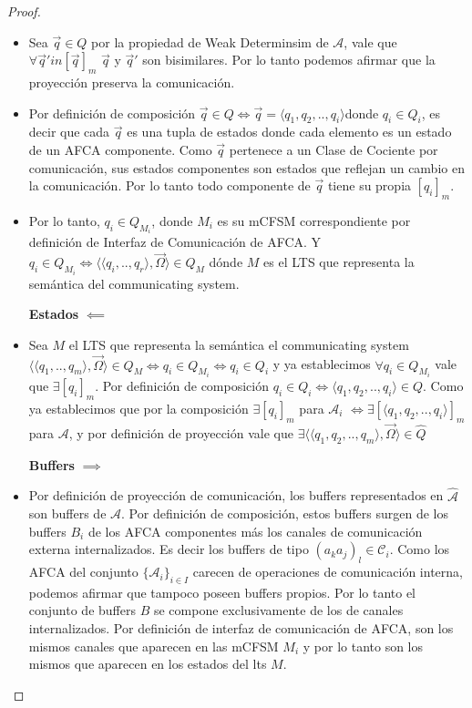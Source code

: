 \begin{prop}
\begin{proof}
\begin{itemize}
    \item Sea $\overrightarrow{q} \in Q$ por la propiedad de Weak Determinsim de $\mathcal{A}$, vale que $\forall \overrightarrow{q}' in [\overrightarrow{q}]_m$ $\overrightarrow{q}$ y $\overrightarrow{q}'$ son bisimilares. Por lo tanto podemos afirmar que la proyección preserva la comunicación.
    
    \item Por definición de composición $\overrightarrow{q} \in Q \iff \overrightarrow{q} = \langle q_1, q_2,.., q_i \rangle $donde $q_i \in Q_i$, es decir que cada $\overrightarrow{q}$ es una tupla de estados donde cada elemento es un estado de un AFCA componente. Como $\overrightarrow{q}$ pertenece a un Clase de Cociente por comunicación, sus estados componentes son estados que reflejan un cambio en la comunicación. Por lo tanto todo componente de $\overrightarrow{q}$ tiene su propia $[q_i]_m$.
    
    \item Por lo tanto, $q_i \in Q_{M_i}$, donde $M_i$ es su mCFSM correspondiente por definición de Interfaz de Comunicación de AFCA. Y $q_i \in Q_{M_i} \iff \langle \langle q_i,..,q_r \rangle, \overrightarrow{\Omega} \rangle \in Q_M$ dónde $M$ es el LTS que representa la semántica del communicating system.
    
    \item[\textbf{Estados} $\impliedby$]
    \item Sea $M$ el LTS que representa la semántica el communicating system $\langle \langle q_1,..,q_m \rangle, \overrightarrow{\Omega} \rangle \in Q_M  \iff q_i \in Q_{M_i} \iff q_i \in Q_i$ y ya establecimos $\forall q_i \in  Q_{M_i}$ vale que $\exists [q_i]_m$. Por definición de composición $q_i \in Q_i \iff \langle q_1, q_2,.., q_i \rangle \in Q $. Como ya establecimos que por la composición $\exists [q_i]_m$ para $\mathcal{A}_i$ $\iff \exists [\langle q_1, q_2,.., q_i \rangle]_m$ para $\mathcal{A}$, y por definición de proyección vale que $\exists \langle \langle q_1, q_2,.., q_m \rangle, \overrightarrow{\Omega} \rangle \in \hat{Q}$
    
    \item[\textbf{Buffers} $\implies$] 
    
    \item Por definición de proyección de comunicación, los buffers representados en $\hat{\mathcal{A}}$ son buffers de $\mathcal{A}$. Por definición de composición, estos buffers surgen de los buffers $B_i$ de los AFCA componentes más los canales de comunicación externa internalizados. Es decir los buffers de tipo $(a_ka_j)_l \in \mathcal{C}_i$. Como los AFCA del conjunto $\{\mathcal{A}_i\}_{i \in I}$ carecen de operaciones de comunicación interna, podemos afirmar que tampoco poseen buffers propios. Por lo tanto el conjunto de buffers $B$ se compone exclusivamente de los de canales internalizados. Por definición de interfaz de comunicación de AFCA, son los mismos canales que aparecen en las mCFSM $M_i$ y por lo tanto son los mismos que aparecen en los estados del lts $M$.


\end{itemize}
\end{proof}
\end{prop}
